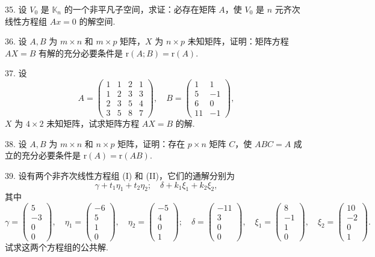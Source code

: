 \documentclass[UTF8,12pt,a4paper,fontset=fandol]{ctexart}
\begin{document}
35. 设 $V_0$ 是 $\mathbb{K}_n$ 的一个非平凡子空间，求证：必存在矩阵 $A$，使 $V_0$ 是 $n$ 元齐次线性方程组 $Ax=0$ 的解空间.

36. 设 $A,B$ 为 $m\times n$ 和 $m\times p$ 矩阵，$X$ 为 $n\times p$ 未知矩阵，证明：矩阵方程 $AX=B$ 有解的充分必要条件是 $\mathrm{r}(A;B)=\mathrm{r}(A)$.

37. 设
\[
A=\left(\begin{array}{rrrr}
1&1&2&1\\
1&2&3&3\\
2&3&5&4\\
3&5&8&7
\end{array}\right),\quad
B=\left(\begin{array}{rr}
1&1\\
5&-1\\
6&0\\
11&-1
\end{array}\right),
\]
$X$ 为 $4\times 2$ 未知矩阵，试求矩阵方程 $AX=B$ 的解.

38. 设 $A,B$ 为 $m\times n$ 和 $n\times p$ 矩阵，证明：存在 $p\times n$ 矩阵 $C$，使 $ABC=A$ 成立的充分必要条件是 $\mathrm{r}(A)=\mathrm{r}(AB)$.

39. 设有两个非齐次线性方程组 (I) 和 (II)，它们的通解分别为
\[
\gamma+t_1\eta_1+t_2\eta_2;\quad \delta+k_1\xi_1+k_2\xi_2,
\]
其中
\[
\gamma=\left(\begin{array}{r}
5\\
-3\\
0\\
0
\end{array}\right),\quad
\eta_1=\left(\begin{array}{r}
-6\\
5\\
1\\
0
\end{array}\right),\quad
\eta_2=\left(\begin{array}{r}
-5\\
4\\
0\\
1
\end{array}\right);
\quad
\delta=\left(\begin{array}{r}
-11\\
3\\
0\\
0
\end{array}\right),\quad
\xi_1=\left(\begin{array}{r}
8\\
-1\\
1\\
0
\end{array}\right),\quad
\xi_2=\left(\begin{array}{r}
10\\
-2\\
0\\
1
\end{array}\right).
\]
试求这两个方程组的公共解.
\end{document}
